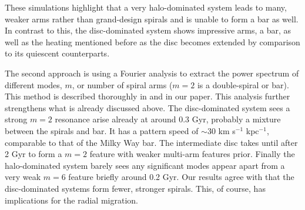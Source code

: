 These simulations highlight that a very halo-dominated system leads to many, weaker arms rather than grand-design spirals and is unable to form a bar as well. In contrast to this, the disc-dominated system shows impressive arms, a bar, as well as the heating mentioned before as the disc becomes extended by comparison to its quiescent counterparts.

The second approach is using a Fourier analysis to extract the power spectrum of different modes, $m$, or number of spiral arms ($m=2$ is a double-spiral or bar). This method is described thoroughly in \cite{roskar:12} and in our paper. This analysis further strengthens what is already discussed above. The disc-dominated system sees a strong $m=2$ resonance arise already at around 0.3 Gyr, probably a mixture between the spirals and bar. It has a pattern speed of ${\sim}30$ km s$^{-1}$ kpc$^{-1}$, comparable to that of the Milky Way bar. The intermediate disc takes until after 2 Gyr to form a $m=2$ feature with weaker multi-arm features prior. Finally the halo-dominated system barely sees any significant modes appear apart from a very weak $m=6$ feature briefly around 0.2 Gyr. Our results agree with \cite{donghia:15} that the disc-dominated systems form fewer, stronger spirals. This, of course, has implications for the radial migration.

